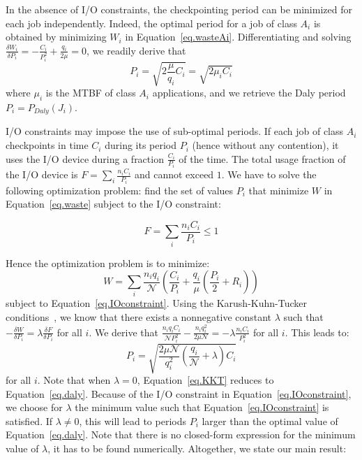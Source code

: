 \documentclass[conference,nofonttune]{IEEEtran}
\newcommand{\nbnodesplat}{{\mathcal N}}
\newcommand{\app}[1]{A_{#1}}
\newcommand{\nbapp}[1]{n_{#1}}
\newcommand{\nbnodes}[1]{q_{#1}}
\newcommand{\period}[1]{P_{#1}}
\newcommand{\ckpt}[1]{C_{#1}}
\newcommand{\reco}[1]{R_{#1}}
\newcommand{\wasteapp}[1]{W_{#1}}
\newcommand{\mtbfplat}{\mu}
\newcommand{\wasteplat}{W}
\newcommand{\ioconstraint}{F}
\begin{document}
In the absence of I/O constraints, the checkpointing period can be minimized
for each job independently. Indeed, the optimal period for a job
of class $\app{i}$ is obtained by minimizing $\wasteapp{i}$ in 
Equation~\eqref{eq.wasteAi}.
Differentiating and solving
$\frac{\delta \wasteapp{i}}{\delta \period{i}} = - \frac{\ckpt{i}}{\period{i}^{2}} + \frac{\nbnodes{i}}{2 \mtbfplat} = 0$,
we readily derive that
\begin{equation}
\period{i} = \sqrt{2 \frac{\mtbfplat}{\nbnodes{i}} \ckpt{i}} = \sqrt{2 \mu_{i} \ckpt{i}}
\label{eq.daly}
\end{equation}
where $\mu_{i}$ is the MTBF of  class $\app{i}$ applications, and we retrieve the Daly period
$\period{i} = \period{Daly}(J_{i})$.

I/O constraints may impose the use of sub-optimal periods. If each job
of class $\app{i}$ checkpoints in time $\ckpt{i}$ during its period $\period{i}$ (hence
without any contention), it uses the I/O device during a fraction $\frac{\ckpt{i}}{\period{i}}$ of the time.
The total usage fraction of the  I/O device is $\ioconstraint = \sum_{i} \frac{\nbapp{i} \ckpt{i}}{\period{i}}$
and cannot exceed $1$. We have to solve the following optimization problem: find
the set of values $\period{i}$ that minimize $\wasteplat$ in Equation~\eqref{eq.waste} subject to the I/O constraint:

\begin{equation}
\ioconstraint = \sum_{i} \frac{\nbapp{i} \ckpt{i}}{\period{i}} \leq 1
\label{eq.IOconstraint}
\end{equation}

Hence the optimization problem is to minimize:
\begin{equation}
\wasteplat = \sum_i \frac{\nbapp{i} \nbnodes{i}}{\nbnodesplat}  \left( \frac{\ckpt{i}}{\period{i}} +
\frac{\nbnodes{i}}{\mtbfplat}(\frac{\period{i}}{2} + \reco{i}) \right)
\label{eq.totalwaste}
\end{equation}
subject to Equation~\eqref{eq.IOconstraint}.
Using the Karush-Kuhn-Tucker conditions~\cite{Boyd2004}, we know that there exists a nonnegative constant
$\lambda$
such that
$- \frac{\delta \wasteplat}{\delta \period{i}} = \lambda \frac{\delta \ioconstraint}{\delta \period{i}}$
for all $i$. We derive that
$\frac{\nbapp{i} \nbnodes{i} \ckpt{i}}{\nbnodesplat \period{i}^{2}} -    \frac{\nbapp{i} \nbnodes{i}^{2}}{2 \mtbfplat \nbnodesplat} = - \lambda \frac{\nbapp{i} \ckpt{i}}{\period{i}^{2}}
$
for all $i$. This leads to:
 \begin{equation}
\period{i} = \sqrt{\frac{2 \mtbfplat  \nbnodesplat}{\nbnodes{i}^{2}} \left(\frac{\nbnodes{i}}{\nbnodesplat} +\lambda \right) \ckpt{i}}
  \label{eq.KKT}
\end{equation}
for all $i$. Note that when $\lambda=0$, Equation~\eqref{eq.KKT} reduces to Equation~\eqref{eq.daly}.
Because of the I/O constraint in Equation~\eqref{eq.IOconstraint}, we choose
for $\lambda$ the minimum value such that Equation~\eqref{eq.IOconstraint} is
satisfied. If $\lambda \neq 0$, this will lead to periods $P_{i}$ larger than
the optimal value of Equation~\eqref{eq.daly}. Note that there is no
closed-form expression for the minimum value of $\lambda$, it has to be found
numerically.
Altogether, we state our main result:
\end{document}
